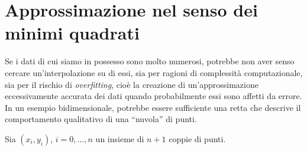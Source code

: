 \section{Approssimazione nel senso dei minimi quadrati}
Se i dati di cui siamo in possesso sono molto numerosi, potrebbe non aver senso cercare un'interpolazione su di essi, sia per ragioni di complessità computazionale, sia per il rischio di \textit{overfitting}, cioè la creazione di un'approssimazione eccessivamente accurata dei dati quando probabilmente essi sono affetti da errore.
In un esempio bidimensionale, potrebbe essere sufficiente una retta che descrive il comportamento qualitativo di una ``nuvola'' di punti.

Sia $( x_{i} ,y_{i})$, $i=0,\dotsc ,n$ un insieme di $n+1$ coppie di punti.


